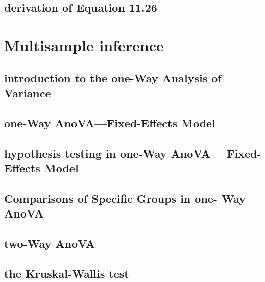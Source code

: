 \documentclass[12pt,]{article}
\begin{document}
\hypertarget{derivation-of-equation-11.26}{%
\subsection{derivation of Equation
11.26}\label{derivation-of-equation-11.26}}

\hypertarget{multisample-inference}{%
\section{Multisample inference}\label{multisample-inference}}

\hypertarget{introduction-to-the-one-way-analysis-of-variance}{%
\subsection{introduction to the one-Way Analysis of
Variance}\label{introduction-to-the-one-way-analysis-of-variance}}

\hypertarget{one-way-anovafixed-effects-model}{%
\subsection{one-Way AnoVA---Fixed-Effects
Model}\label{one-way-anovafixed-effects-model}}

\hypertarget{hypothesis-testing-in-one-way-anova-fixed-effects-model}{%
\subsection{hypothesis testing in one-Way AnoVA--- Fixed-Effects
Model}\label{hypothesis-testing-in-one-way-anova-fixed-effects-model}}

\hypertarget{comparisons-of-specific-groups-in-one--way-anova}{%
\subsection{Comparisons of Specific Groups in one- Way
AnoVA}\label{comparisons-of-specific-groups-in-one--way-anova}}

\hypertarget{two-way-anova}{%
\subsection{two-Way AnoVA}\label{two-way-anova}}

\hypertarget{the-kruskal-wallis-test}{%
\subsection{the Kruskal-Wallis test}\label{the-kruskal-wallis-test}}
\end{document}
